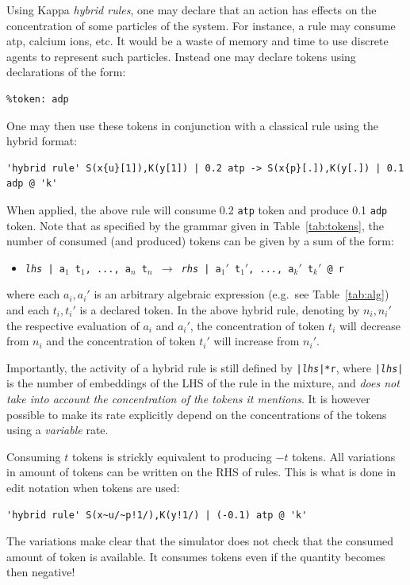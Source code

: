 \documentclass[11pt]{book}
\def\ttt#1{\texttt{#1}}
\def\rar{\rightarrow}
\def\eg{e.g.~}
\def\ITE#1{\begin{itemize}#1\end{itemize}}
\def\imp#1{\emph{#1}\index{#1}}
\begin{document}
Using Kappa \imp{hybrid rules}, one may declare that an action has
effects on the concentration of some particles of the system. For
instance, a rule may consume atp, calcium ions, etc. It would be a waste
of memory and time to use discrete agents to represent such
particles. Instead one may declare tokens using
declarations of the form:
\begin{lstlisting}[language=kappa]
%token: atp
%token: adp
\end{lstlisting}
One may then use these tokens in conjunction with a classical rule
using the hybrid format:
\begin{lstlisting}[language=kappa]
'hybrid rule' S(x{u}[1]),K(y[1]) | 0.2 atp -> S(x{p}[.]),K(y[.]) | 0.1 adp @ 'k'
\end{lstlisting}
When applied, the above rule will consume 0.2 \ttt{atp} token and
produce 0.1 \ttt{adp} token. Note that as specified by the grammar
given in Table~\ref{tab:tokens}, the number of consumed (and produced)
tokens can be given by a sum of the form: \ITE{
\item[] \ttt{\textit{lhs} | a$_1$ t$_1$, ..., a$_n$ t$_n$ $\rar$
  \textit{rhs} | a$_1'$ t$_1'$, ..., a$_k'$ t$_k'$ @ r} } where each
$a_i,a_i'$ is an arbitrary algebraic expression ({\eg}see Table~\ref{tab:alg}) and each $t_i,t_i'$ is a
declared token. In the above hybrid rule, denoting by  $n_i,n_i'$ the
respective evaluation of $a_i$ and $a_i'$, the concentration of token $t_i$ will
decrease from $n_i$ and the concentration of token $t_i'$ will
increase from $n_i'$.

Importantly, the activity of a hybrid rule is still
defined by \ttt{|\textit{lhs}|*r}, where \ttt{|\textit{lhs}|} is
the number of embeddings of the LHS of the rule in the mixture, and
\emph{does not take into account the concentration of the tokens it
  mentions}. It is however possible to make its rate explicitly
depend on the concentrations of the tokens using a \imp{variable}
rate.

Consuming $t$ tokens is strickly equivalent to producing $-t$
tokens. All variations in amount of tokens can be written on the RHS
of rules. This is what is done in edit notation when tokens
are used:
\begin{lstlisting}[language=kappa]
'hybrid rule' S(x~u/~p!1/),K(y!1/) | (-0.1) atp @ 'k'
\end{lstlisting}

The variations make clear that the simulator
does not check that the consumed amount of token is available. It
consumes tokens even if the quantity becomes then negative!
\end{document}
